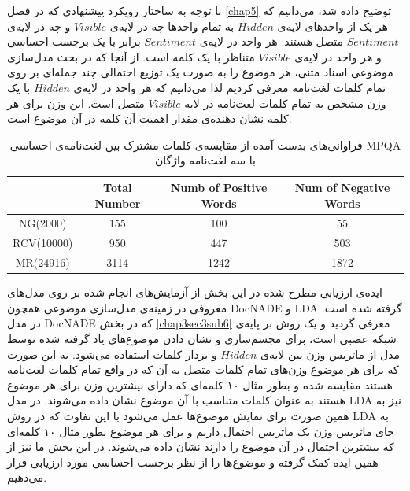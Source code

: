 با توجه به ساختار رویکرد پیشنهادی که در فصل
\ref{chap5}
توضیح داده شد، می‌‌دانیم که هر یک از واحدهای لایه‌ی
$Hidden$
به تمام واحدها چه در لایه‌ی
$Visible$
و چه در لایه‌ی
$Sentiment$
متصل هستند. هر واحد در لایه‌ی
$Sentiment$
برابر با یک برچسب احساسی‌ و هر واحد در لایه‌ی
$Visible$
متناظر با یک کلمه است. از آنجا که در بحث مدل‌سازی موضوعی اسناد متنی، هر موضوع را به صورت یک توزیع احتمالی چند جمله‌ای بر روی تمام کلمات لغت‌نامه معرفی‌ کردیم لذا می‌دانیم که هر واحد در لایه‌ی
$Hidden$
با یک وزن مشخص به تمام کلمات لغت‌نامه در لایه
$Visible$
متصل است. این وزن  برای هر کلمه نشان دهنده‌ی مقدار اهمیت آن کلمه در آن موضوع است.
\begin{table}[!t]
	\centering
	\begin{latin}
		\begin{tabular}{|c|c|c|c|}
			\hline
			& Total Number & Numb of Positive Words & Num of Negative Words \\ \hline
			NG(2000)  &     155      &          100           &          55           \\ \hline
			RCV(10000) &     950      &          447           &          503          \\ \hline
			MR(24916)  &     3114     &          1242          &         1872          \\ \hline
		\end{tabular}
	\end{latin}
	\caption{فراوانی‌های بدست آمده از مقایسه‌ی کلمات مشترک بین لغت‌نامه‌ی احساسی MPQA با سه لغت‌نامه واژگان}
	\label{chap5-tb3}
\end{table}
ایده‌ی ارزیابی مطرح شده در این بخش از آزمایش‌های انجام شده بر روی مدل‌های معروفی‌ در زمینه‌ی مدل‌سازی موضوعی همچون
DocNADE
و
LDA
گرفته شده است. در مدل
DocNADE
که در بخش 
\ref{chap3sec3sub6}
معرفی گردید و یک روش بر پایه‌ی شبکه عصبی است، برای مجسم‌سازی و نشان دادن موضوع‌های یاد گرفته شده توسط مدل از ماتریس وزن بین لایه‌ی
$Hidden$
و بردار کلمات استفاده می‌‌شود. به این صورت که برای هر موضوع وزن‌های تمام کلمات متصل به آن که در واقع تمام کلمات لغت‌نامه هستند مقایسه شده و بطور مثال ۱۰ کلمه‌ای‌ که دارای بیشترین وزن برای هر موضوع هستند به عنوان کلمات متناسب با آن موضوع نشان داده می‌‌شوند. در مدل
LDA
نیز به همین صورت برای نمایش موضوع‌ها عمل می‌‌شود با این تفاوت که در روش
LDA
به جای ماتریس وزن یک ماتریس احتمال داریم و برای هر موضوع بطور مثال ۱۰ کلمه‌ای‌ که بیشترین احتمال در آن موضوع را دارند نشان داده می‌‌شوند.
در این بخش ما نیز از همین ایده کمک گرفته و موضوع‌ها را از نظر برچسب احساسی‌ مورد ارزیابی قرار می‌دهیم.

